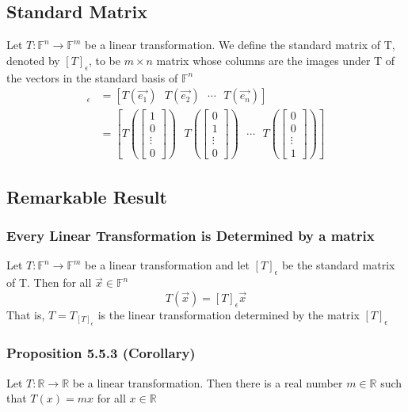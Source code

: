 \documentclass[12pt, letterpaper]{article}
\begin{document}
\subsection{Standard Matrix}
Let $T: \mathbb{F}^n \rightarrow\mathbb{F}^m$ be a linear transformation. We define the standard matrix of T, denoted by $[T]_\epsilon$, to be $m\times n$ matrix whose columns are the images under T of the vectors in the standard basis of $\mathbb{F}^n$
\begin{align*}
    [T]_\epsilon &= [T(\vec{e_1}) \text{ } T(\vec{e_2}) \text{ } \cdots \text{ } T(\vec{e_n})] \\
                 &= [T(\begin{bmatrix} 1 \\ 0 \\ \vdots \\ 0 \end{bmatrix}) \text{ } T(\begin{bmatrix} 0 \\ 1 \\ \vdots \\ 0 \end{bmatrix}) \text{ } \cdots \text{ } T(\begin{bmatrix} 0 \\ 0 \\ \vdots \\ 1 \end{bmatrix})]
\end{align*}
\subsection*{Remarkable Result}
\subsubsection{Every Linear Transformation is Determined by a matrix}
Let $T: \mathbb{F}^n \rightarrow\mathbb{F}^m$ be a linear transformation and let $[T]_\epsilon$ be the standard matrix of T. Then for all $\vec{x}\in\mathbb{F}^n$
\[T(\vec{x}) = [T]_\epsilon\vec{x}\]
That is, $T = T_{[T]_\epsilon}$ is the linear transformation determined by the matrix $[T]_\epsilon$
\subsubsection{Proposition 5.5.3 (Corollary)}
Let $T:\mathbb{R}\rightarrow\mathbb{R}$ be a linear transformation. Then there is a real number $m\in\mathbb{R}$ such that $T(x) = mx$ for all $x\in\mathbb{R}$
\end{document}
